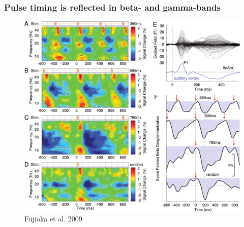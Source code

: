 \documentclass{beamer}
\begin{document}
\begin{frame}
	\frametitle{Pulse timing is reflected in beta- and gamma-bands}

	\begin{figure}
		\centering
		\includegraphics[scale=0.18]{fig5.jpg}
		\caption{Fujioka et al. 2009}
	\end{figure}

\end{frame}
\end{document}

